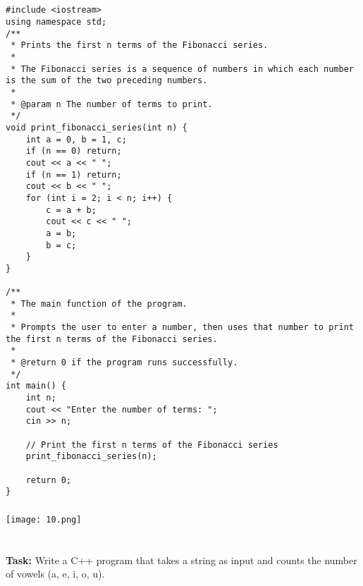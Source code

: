 \documentclass[12pt,a4paper]{article}
\begin{document}
\subsection{}
\begin{lstlisting}
#include <iostream>
using namespace std;
/**
 * Prints the first n terms of the Fibonacci series.
 *
 * The Fibonacci series is a sequence of numbers in which each number is the sum of the two preceding numbers.
 *
 * @param n The number of terms to print.
 */
void print_fibonacci_series(int n) {
    int a = 0, b = 1, c;
    if (n == 0) return;
    cout << a << " ";
    if (n == 1) return;
    cout << b << " ";
    for (int i = 2; i < n; i++) {
        c = a + b;
        cout << c << " ";
        a = b;
        b = c;
    }
}

/**
 * The main function of the program.
 *
 * Prompts the user to enter a number, then uses that number to print the first n terms of the Fibonacci series.
 *
 * @return 0 if the program runs successfully.
 */
int main() {
    int n;
    cout << "Enter the number of terms: ";
    cin >> n;

    // Print the first n terms of the Fibonacci series
    print_fibonacci_series(n);

    return 0;
}

\end{lstlisting}

\subsubsection{}
\begin{center}
    \texttt{[image: 10.png]}
\end{center}


\section{}
\textbf{Task:} Write a C++ program that takes a string as input and counts the number of vowels (a, e, i, o, u).
\end{document}
